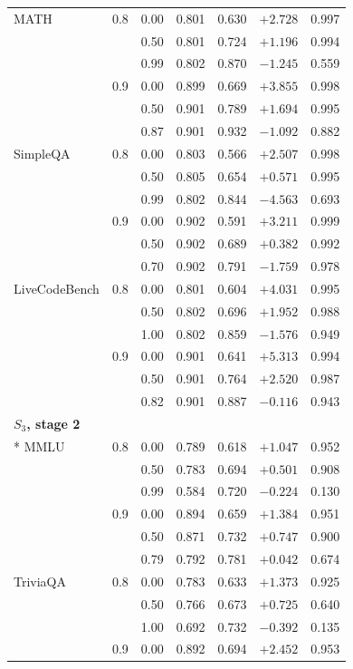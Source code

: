 \begin{longtable}{llrrrrr}
MATH & 0.8 & 0.00 & 0.801 & 0.630 & $+2.728$ & 0.997 \\
 &  & 0.50 & 0.801 & 0.724 & $+1.196$ & 0.994 \\
 &  & 0.99 & 0.802 & 0.870 & $-1.245$ & 0.559 \\
 & 0.9 & 0.00 & 0.899 & 0.669 & $+3.855$ & 0.998 \\
 &  & 0.50 & 0.901 & 0.789 & $+1.694$ & 0.995 \\
 &  & 0.87 & 0.901 & 0.932 & $-1.092$ & 0.882 \\
SimpleQA & 0.8 & 0.00 & 0.803 & 0.566 & $+2.507$ & 0.998 \\
 &  & 0.50 & 0.805 & 0.654 & $+0.571$ & 0.995 \\
 &  & 0.99 & 0.802 & 0.844 & $-4.563$ & 0.693 \\
 & 0.9 & 0.00 & 0.902 & 0.591 & $+3.211$ & 0.999 \\
 &  & 0.50 & 0.902 & 0.689 & $+0.382$ & 0.992 \\
 &  & 0.70 & 0.902 & 0.791 & $-1.759$ & 0.978 \\
LiveCodeBench & 0.8 & 0.00 & 0.801 & 0.604 & $+4.031$ & 0.995 \\
 &  & 0.50 & 0.802 & 0.696 & $+1.952$ & 0.988 \\
 &  & 1.00 & 0.802 & 0.859 & $-1.576$ & 0.949 \\
 & 0.9 & 0.00 & 0.901 & 0.641 & $+5.313$ & 0.994 \\
 &  & 0.50 & 0.901 & 0.764 & $+2.520$ & 0.987 \\
 &  & 0.82 & 0.901 & 0.887 & $-0.116$ & 0.943 \\
\multicolumn{7}{l}{\textbf{$S_3$, stage 2}} \\*
\midrule
MMLU & 0.8 & 0.00 & 0.789 & 0.618 & $+1.047$ & 0.952 \\
 &  & 0.50 & 0.783 & 0.694 & $+0.501$ & 0.908 \\
 &  & 0.99 & 0.584 & 0.720 & $-0.224$ & 0.130 \\
 & 0.9 & 0.00 & 0.894 & 0.659 & $+1.384$ & 0.951 \\
 &  & 0.50 & 0.871 & 0.732 & $+0.747$ & 0.900 \\
 &  & 0.79 & 0.792 & 0.781 & $+0.042$ & 0.674 \\
TriviaQA & 0.8 & 0.00 & 0.783 & 0.633 & $+1.373$ & 0.925 \\
 &  & 0.50 & 0.766 & 0.673 & $+0.725$ & 0.640 \\
 &  & 1.00 & 0.692 & 0.732 & $-0.392$ & 0.135 \\
 & 0.9 & 0.00 & 0.892 & 0.694 & $+2.452$ & 0.953 \\

\end{longtable}

